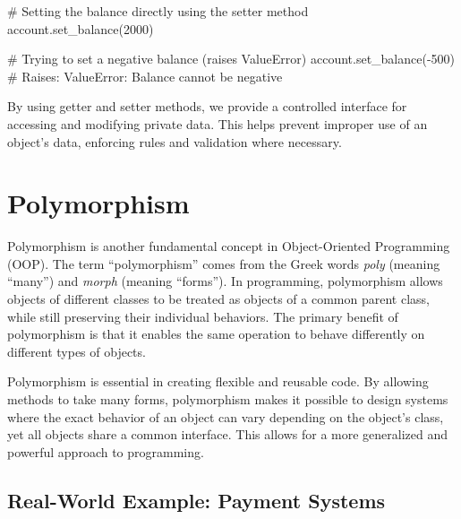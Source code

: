 \documentclass[
  letterpaper,
  DIV=11,
  numbers=noendperiod]{scrreprt}
\newenvironment{Shaded}{\begin{snugshade}}{\end{snugshade}}
\newcommand{\CommentTok}[1]{\textcolor[rgb]{0.37,0.37,0.37}{#1}}
\newcommand{\DecValTok}[1]{\textcolor[rgb]{0.68,0.00,0.00}{#1}}
\newcommand{\NormalTok}[1]{\textcolor[rgb]{0.00,0.23,0.31}{#1}}
\newcommand{\OperatorTok}[1]{\textcolor[rgb]{0.37,0.37,0.37}{#1}}
\begin{document}
\begin{Shaded}
\begin{Highlighting}[]
\CommentTok{\# Setting the balance directly using the setter method}
\NormalTok{account.set\_balance(}\DecValTok{2000}\NormalTok{)}
\end{Highlighting}
\end{Shaded}

\begin{Shaded}
\begin{Highlighting}[]
\CommentTok{\# Trying to set a negative balance (raises ValueError)}
\NormalTok{account.set\_balance(}\OperatorTok{{-}}\DecValTok{500}\NormalTok{)  }\CommentTok{\# Raises: ValueError: Balance cannot be negative}
\end{Highlighting}
\end{Shaded}

By using getter and setter methods, we provide a controlled interface
for accessing and modifying private data. This helps prevent improper
use of an object's data, enforcing rules and validation where necessary.

\hypertarget{polymorphism}{%
\section{Polymorphism}\label{polymorphism}}

Polymorphism is another fundamental concept in Object-Oriented
Programming (OOP). The term ``polymorphism'' comes from the Greek words
\emph{poly} (meaning ``many'') and \emph{morph} (meaning ``forms''). In
programming, polymorphism allows objects of different classes to be
treated as objects of a common parent class, while still preserving
their individual behaviors. The primary benefit of polymorphism is that
it enables the same operation to behave differently on different types
of objects.

Polymorphism is essential in creating flexible and reusable code. By
allowing methods to take many forms, polymorphism makes it possible to
design systems where the exact behavior of an object can vary depending
on the object's class, yet all objects share a common interface. This
allows for a more generalized and powerful approach to programming.

\hypertarget{real-world-example-payment-systems}{%
\subsection{Real-World Example: Payment
Systems}\label{real-world-example-payment-systems}}
\end{document}
